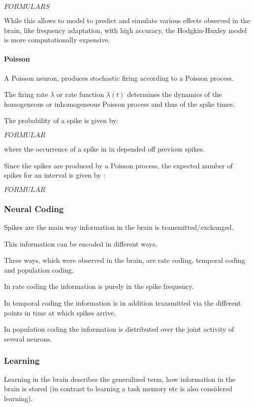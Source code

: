 $FORMULARS$

While this allows to model to predict and simulate various effects observed in the brain, like frequency adaptation, with high accuracy, the Hodgkin-Huxley model is more computationally expensive.

\paragraph{Poisson}

A Poisson neuron, produces stochastic firing according to a Poisson process.

The firing rate $\lambda$ or rate function $\lambda(t)$ determines the dynamics of the homogeneous or inhomogeneous Poisson process and thus of the spike times.   

The probability of a spike is given by: 

$FORMULAR$

where the occurrence of a spike in in depended off previous spikes. 

Since the spikes are produced by a Poisson process, the expected number of spikes for an interval is given by :

$FORMULAR$ 


\subsubsection{Neural Coding}

Spikes are the main way information in the brain is transmitted/exchanged.

This information can be encoded in different ways.

Three ways, which were observed in the brain, are rate coding, temporal coding and population coding.

In rate coding the information is purely in the spike frequency.

In temporal coding the information is in addition transmitted via the different points in time at which spikes arrive.

In population coding the information is distributed over the joint activity of several neurons.  

\subsubsection{Learning}

Learning in the brain describes the generalized term, how information in the brain is stored (in contrast to learning a task memory etc is also considered learning).

